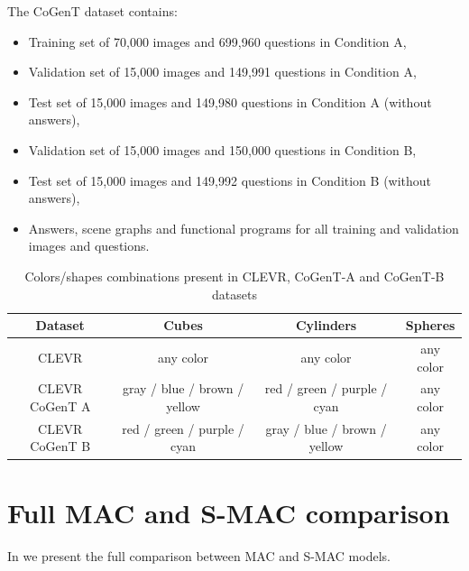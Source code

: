 The CoGenT dataset contains:
\begin{itemize}
\item	Training set of 70,000 images and 699,960 questions in Condition A,
\item	Validation set of 15,000 images and 149,991 questions in Condition A,
\item	Test set of 15,000 images and 149,980 questions in Condition A (without answers),
\item	Validation set of 15,000 images and 150,000 questions in Condition B,
\item	Test set of 15,000 images and 149,992 questions in Condition B (without answers),
\item	Answers, scene graphs and functional programs for all training and validation images and questions.
\end{itemize}

\begin{table}[h!]
	\centering
	\begin{tabular}{cccc}
		\toprule
		Dataset        & Cubes              & Cylinders &  Spheres         \\
		\midrule
		CLEVR   &  any color &  any color        &    any color    \\
		CLEVR CoGenT A & gray / blue / brown / yellow  & red / green / purple / cyan       &    any color  \\
		CLEVR CoGenT B  & red / green / purple / cyan &   gray / blue / brown / yellow       &      any color  \\
		\bottomrule
	\end{tabular}
	\caption{Colors/shapes combinations present in CLEVR, CoGenT-A and CoGenT-B datasets}
	\label{tab:cogent_conditions}
\end{table}

 
 \newpage
\section{Full MAC and S-MAC comparison}

In  we present the full comparison between MAC and S-MAC models.



